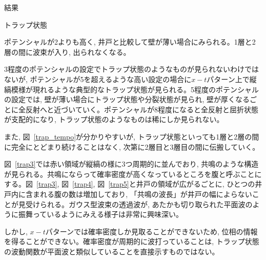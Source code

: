 \documentclass[a4paper, lualatex]{bxjsarticle}
\newcommand{\fref}[1]{図~\ref{#1}}
\begin{document}
\begin{section}{結果}
\begin{subsection}{トラップ状態}
\begin{figure}[h]
        \end{figure}
    \par ポテンシャルが2よりも高く, 井戸と比較して壁が薄い場合にみられる。1層と2層の間に波束が入り, 出られなくなる。
    \par 3程度のポテンシャルの設定でトラップ状態のようなものが見られないわけではないが, ポテンシャルが5を超えるような高い設定の場合に$x-t$パターン上で縦縞模様が現れるような典型的なトラップ状態が見られる。5程度のポテンシャルの設定では, 壁が薄い場合にトラップ状態や分裂状態が見られ, 壁が厚くなるごとに全反射へと近づいていく。ポテンシャルが8程度になると全反射と屈折状態が支配的になり, トラップ状態のようなものは稀にしか見られない。
    \par また, \fref{trap_tempo}が分かりやすいが, トラップ状態といっても1層と2層の間に完全にとどまり続けることはなく, 次第に2層目と3層目の間に伝搬していく。
    \par \fref{trap3}では赤い領域が縦縞の様に3つ周期的に並んでおり, 共鳴のような構造が見られる。共鳴にならって確率密度が高くなっているところを腹と呼ぶことにする。\fref{trap3}, \fref{trap4}, \fref{trap5}と井戸の領域が広がるごとに, ひとつの井戸内に含まれる腹の数は増加しており, 「共鳴の波長」が井戸の幅によらないことが見受けられる。ガウス型波束の透過波が, あたかも切り取られた平面波のように振舞っているようにみえる様子は非常に興味深い。
    \par しかし, $x-t$パターンでは確率密度しか見取ることができないため, 位相の情報を得ることができない。確率密度が周期的に波打っていることは, トラップ状態の波動関数が平面波と類似していることを直接示すものではない。
    \end{subsection}

    \newpage


\end{section}
\end{document}
